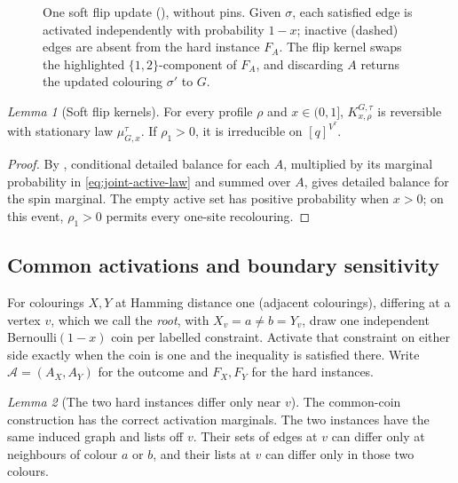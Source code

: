 \documentclass[11pt,reqno]{article}
\theoremstyle{plain}
\newtheorem{lemma}[theorem]{Lemma}
\theoremstyle{definition}
\theoremstyle{remark}
\newtheorem{lemma}[lemma]{Lemma}
\theoremstyle{definition}
\theoremstyle{remark}
\newcommand{\colours}{[q]}                        %
\newcommand{\mupin}[3]{\mu_{#1,#3}^{#2}}
\begin{document}
\begin{figure}[t]
\caption{One soft flip update (), without pins.
Given \(\sigma\), each satisfied edge is activated independently with
probability \(1-x\); inactive (dashed) edges are absent from the hard
instance \(F_A\).  The flip kernel swaps the highlighted
\(\{1,2\}\)-component of \(F_A\), and discarding \(A\) returns the
updated colouring \(\sigma'\) to \(G\).}
\label{fig:soft-kernel-step}
\end{figure}

\begin{lemma}[Soft flip kernels]\label{lem:soft-stationary}
For every profile \(\rho\) and \(x\in(0,1]\),
\(K_{x,\rho}^{G,\tau}\) is reversible with stationary law
\(\mupin{G}{\tau}{x}\).  If \(\rho_1>0\), it is irreducible on
\(\colours^{V^\tau}\).
\end{lemma}

\begin{proof}
By , conditional detailed balance for each \(A\),
multiplied by its marginal
probability in \eqref{eq:joint-active-law} and summed over \(A\), gives
detailed balance for the spin marginal.  The empty active set has positive
probability when \(x>0\); on this event, \(\rho_1>0\) permits every
one-site recolouring.
\end{proof}

\subsection{Common activations and boundary sensitivity}
\label{sec:boundary-sensitivity}

For colourings \(X,Y\) at Hamming distance one (adjacent colourings),
differing at a vertex \(v\), which we call the \emph{root}, with
\(X_v=a\ne b=Y_v\), draw one independent Bernoulli\((1-x)\) coin per
labelled constraint.  Activate that constraint on either side exactly when
the coin is one and the inequality is satisfied there.  Write
\(\mathcal A=(A_X,A_Y)\) for the outcome and \(F_X,F_Y\) for the hard
instances.

\begin{lemma}[The two hard instances differ only near \(v\)]
\label{lem:coupled-activation-root-local}
The common-coin construction has the correct activation marginals.
The two instances have the same induced graph and lists off \(v\).  Their
sets of edges at \(v\) can differ only at neighbours of colour \(a\) or
\(b\), and their lists at \(v\) can differ only in those two colours.
\end{lemma}
\end{document}

